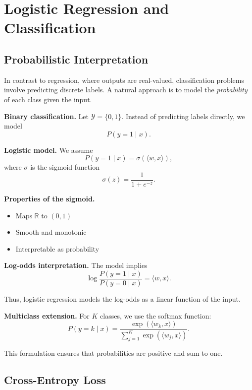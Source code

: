\chapter{Logistic Regression and Classification}

\section{Probabilistic Interpretation}

In contrast to regression, where outputs are real-valued, classification problems involve predicting discrete labels. A natural approach is to model the \emph{probability} of each class given the input.

\medskip

\noindent
\textbf{Binary classification.}  
Let $\mathcal{Y} = \{0,1\}$. Instead of predicting labels directly, we model
\[
P(y = 1 \mid x).
\]

\medskip

\noindent
\textbf{Logistic model.}  
We assume
\[
P(y = 1 \mid x) = \sigma(\langle w, x \rangle),
\]
where $\sigma$ is the sigmoid function
\[
\sigma(z) = \frac{1}{1 + e^{-z}}.
\]

\medskip

\noindent
\textbf{Properties of the sigmoid.}
\begin{itemize}
    \item Maps $\mathbb{R}$ to $(0,1)$
    \item Smooth and monotonic
    \item Interpretable as probability
\end{itemize}

\medskip

\noindent
\textbf{Log-odds interpretation.}  
The model implies
\[
\log \frac{P(y=1 \mid x)}{P(y=0 \mid x)} = \langle w, x \rangle.
\]

\medskip

\noindent
Thus, logistic regression models the log-odds as a linear function of the input.

\medskip

\noindent
\textbf{Multiclass extension.}  
For $K$ classes, we use the softmax function:
\[
P(y = k \mid x) = \frac{\exp(\langle w_k, x \rangle)}{\sum_{j=1}^K \exp(\langle w_j, x \rangle)}.
\]

\medskip

\noindent
This formulation ensures that probabilities are positive and sum to one.

\section{Cross-Entropy Loss}

